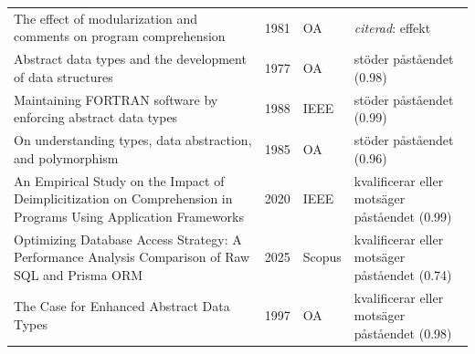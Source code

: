 \begin{longtable}{@{}%
  >{\raggedright\arraybackslash}p{}c%
  >{\raggedright\arraybackslash}p{}%
  >{\raggedright\arraybackslash}p{}@{}}
The effect of modularization and comments on program comprehension & 1981 & OA & \emph{citerad}: effekt \\
Abstract data types and the development of data structures & 1977 & OA & stöder påståendet (0.98) \\
Maintaining FORTRAN software by enforcing abstract data types & 1988 & IEEE & stöder påståendet (0.99) \\
On understanding types, data abstraction, and polymorphism & 1985 & OA & stöder påståendet (0.96) \\
An Empirical Study on the Impact of Deimplicitization on Comprehension in Programs Using Application Frameworks & 2020 & IEEE & kvalificerar eller motsäger påståendet (0.99) \\
Optimizing Database Access Strategy: A Performance Analysis Comparison of Raw SQL and Prisma ORM & 2025 & Scopus & kvalificerar eller motsäger påståendet (0.74) \\
The Case for Enhanced Abstract Data Types & 1997 & OA & kvalificerar eller motsäger påståendet (0.98) \\
\end{longtable}
\endgroup
